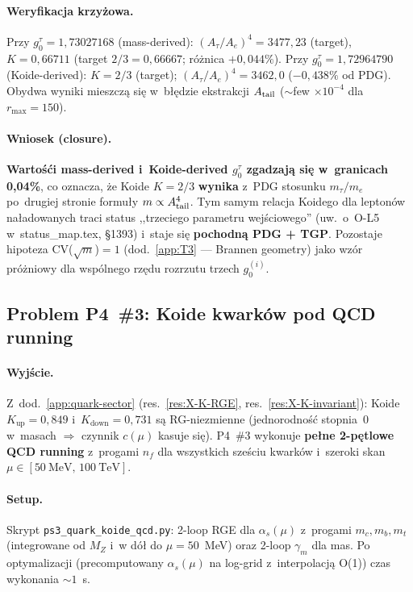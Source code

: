 \paragraph{Weryfikacja krzy\.zowa.}
Przy $g_0^\tau = 1{,}73027168$ (mass-derived):
$(A_\tau/A_e)^4 = 3477{,}23$ (target), $K=0{,}66711$
(target $2/3 = 0{,}66667$; r\'o\.znica $+0{,}044\%$).
Przy $g_0^\tau = 1{,}72964790$ (Koide-derived):
$K=2/3$ (target); $(A_\tau/A_e)^4 = 3462{,}0$ ($-0{,}438\%$ od PDG).
Obydwa wyniki mieszcz\k{a} si\k{e} w~b\l{}\k{e}dzie ekstrakcji $A_{\rm tail}$
($\sim$few $\times 10^{-4}$ dla $r_{\max}=150$).

\paragraph{Wniosek (closure).}
\textbf{Warto\'s\'ci mass-derived i~Koide-derived $g_0^\tau$ zgadzaj\k{a} si\k{e}
w~granicach 0{,}04\%}, co oznacza, \.ze Koide $K=2/3$ \textbf{wynika}
z~PDG stosunku $m_\tau/m_e$ po~drugiej stronie formu\l{}y $m \propto A_{\rm tail}^4$.
Tym samym relacja Koidego dla lepton\'ow na\l{}adowanych traci
status ,,trzeciego parametru wej\'sciowego'' (uw.\ o~O-L5
w~status\_map.tex, \S1393) i~staje si\k{e} \textbf{pochodn\k{a} PDG + TGP}.
Pozostaje hipoteza CV($\sqrt m$)$=1$
(dod.~\ref{app:T3} --- Brannen geometry) jako wz\'or pr\'o\.zniowy
dla wsp\'olnego rz\k{e}du rozrzutu trzech $g_0^{(i)}$.

\subsection{Problem P4~\#3: Koide kwark\'ow pod QCD running}%
\label{app:P4-quarks}

\paragraph{Wyj\'scie.}
Z~dod.~\ref{app:quark-sector} (res.~\ref{res:X-K-RGE}, res.~\ref{res:X-K-invariant}):
Koide $K_\text{up}=0{,}849$ i~$K_\text{down}=0{,}731$ s\k{a} RG-niezmienne
(jednorodno\'s\'c stopnia~$0$ w~masach $\Rightarrow$ czynnik $c(\mu)$
kasuje si\k{e}). P4~\#3 wykonuje \textbf{pe\l{}ne 2-p\k{e}tlowe QCD running}
z~progami $n_f$ dla wszystkich sze\'sciu kwark\'ow i~szeroki skan
$\mu \in [50~\mathrm{MeV},\,100~\mathrm{TeV}]$.

\paragraph{Setup.}
Skrypt \texttt{ps3\_quark\_koide\_qcd.py}: 2-loop RGE dla $\alpha_s(\mu)$
z~progami $m_c, m_b, m_t$ (integrowane od $M_Z$ i~w d\'o\l{} do $\mu=50$~MeV)
oraz 2-loop $\gamma_m$ dla mas. Po optymalizacji
(precomputowany $\alpha_s(\mu)$ na log-grid z~interpolacj\k{a} O(1))
czas wykonania $\sim 1$~s.

